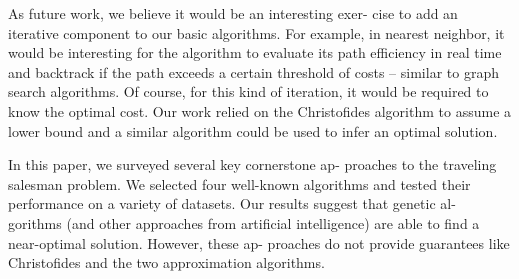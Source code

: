 \documentclass[10pt,twocolumn,letterpaper]{article}
\begin{document}
As future work, we believe it would be an interesting exer-
cise to add an iterative component to our basic algorithms.
For example, in nearest neighbor, it would be interesting for
the algorithm to evaluate its path efficiency in real time and
backtrack if the path exceeds a certain threshold of costs –
similar to graph search algorithms. Of course, for this kind
of iteration, it would be required to know the optimal cost.
Our work relied on the Christofides algorithm to assume a
lower bound and a similar algorithm could be used to infer
an optimal solution.

In this paper, we surveyed several key cornerstone ap-
proaches to the traveling salesman problem. We selected
four well-known algorithms and tested their performance on
a variety of datasets. Our results suggest that genetic al-
gorithms (and other approaches from artificial intelligence)
are able to find a near-optimal solution. However, these ap-
proaches do not provide guarantees like Christofides and the
two approximation algorithms.

{\small


}
\end{document}
